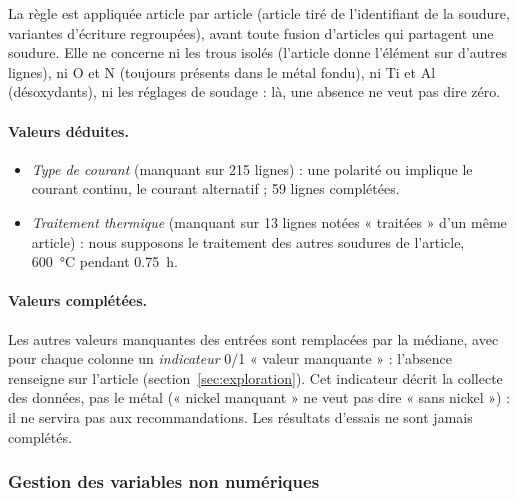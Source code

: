 La règle est appliquée article par article (article tiré de l'identifiant de la soudure,
variantes d'écriture regroupées), avant toute fusion d'articles qui partagent une soudure.
Elle ne concerne ni les trous isolés (l'article donne l'élément sur d'autres lignes), ni
O et N (toujours présents dans le métal fondu), ni Ti et Al (désoxydants), ni les
réglages de soudage : là, une absence ne veut pas dire zéro.

\paragraph{Valeurs déduites.}
\begin{itemize}
  \item \emph{Type de courant} (manquant sur 215 lignes) : une polarité \code{+} ou
    \code{-} implique le courant continu,  le courant alternatif ; 59 lignes
    complétées.
  \item \emph{Traitement thermique} (manquant sur 13 lignes notées « traitées » d'un
    même article) : nous supposons le traitement des autres soudures de l'article,
    \SI{600}{\celsius} pendant \SI{0,75}{\hour}.
\end{itemize}

\paragraph{Valeurs complétées.} Les autres valeurs manquantes des entrées sont remplacées
par la médiane, avec pour chaque colonne un \emph{indicateur} 0/1 « valeur manquante » :
l'absence renseigne sur l'article (section~\ref{sec:exploration}). Cet indicateur décrit
la collecte des données, pas le métal (« nickel manquant » ne veut pas dire « sans
nickel ») : il ne servira pas aux recommandations. Les résultats d'essais ne sont jamais
complétés.



\subsubsection{Gestion des variables non numériques}

